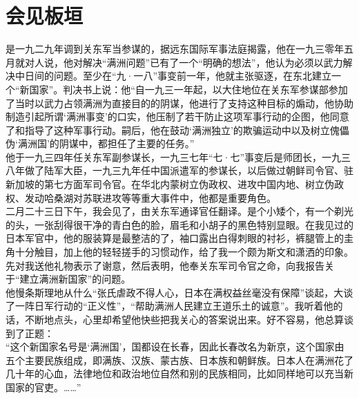 \fancyhead[RO]{} %
\fancyhead[LE]{} %
\chapter*{会见板垣}
\thispagestyle{empty}
是一九二九年调到关东军当参谋的，据远东国际军事法庭揭露，他在一九三零年五月就对人说，他对解决“满洲问题”已有了一个“明确的想法”，他认为必须以武力解决中日间的问题。至少在“九·一八”事变前一年，他就主张驱逐，在东北建立一个“新国家”。判决书上说：他“自一九三一年起，以大住地位在关东军参谋部参加了当时以武力占领满洲为直接目的的阴谋，他进行了支持这种目标的煽动，他协助制造引起所谓‘满洲事变’的口实，他压制了若干防止这项军事行动的企图，他同意了和指导了这种军事行动。嗣后，他在鼓动‘满洲独立’的欺骗运动中以及树立傀儡伪‘满洲国’的阴谋中，都担任了主要的任务。”\\

他于一九三四年任关东军副参谋长，一九三七年“七·七”事变后是师团长，一九三八年做了陆军大臣，一九三九年任中国派遣军的参谋长，以后做过朝鲜司令官、驻新加坡的第七方面军司令官。在华北内蒙树立伪政权、进攻中国内地、树立伪政权、发动哈桑湖对苏联进攻等等重大事件中，他都是重要角色。\\

二月二十三日下午，我会见了，由关东军通译官任翻译。是个小矮个，有一个剃光的头，一张刮得很干净的青白色的脸，眉毛和小胡子的黑色特别显眼。在我见过的日本军官中，他的服装算是最整洁的了，袖口露出白得刺眼的衬衫，裤腿管上的圭角十分触目，加上他的轻轻搓手的习惯动作，给了我一个颇为斯文和潇洒的印象。先对我送他礼物表示了谢意，然后表明，他奉关东军司令官之命，向我报告关于“建立满洲新国家”的问题。\\

他慢条斯理地从什么“张氏虐政不得人心，日本在满权益丝毫没有保障”谈起，大谈了一阵日军行动的“正义性”，“帮助满洲人民建立王道乐土的诚意”。我听着他的话，不断地点头，心里却希望他快些把我关心的答案说出来。好不容易，他总算谈到了正题：\\

“这个新国家名号是‘满洲国’，国都设在长春，因此长春改名为新京，这个国家由五个主要民族组成，即满族、汉族、蒙古族、日本族和朝鲜族。日本人在满洲花了几十年的心血，法律地位和政治地位自然和别的民族相同，比如同样地可以充当新国家的官吏。……”\\

